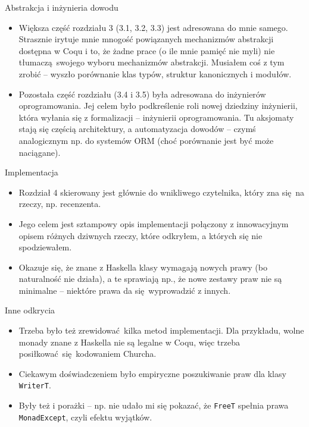 \documentclass{beamer}
\begin{document}
\begin{frame}{Abstrakcja i inżynieria dowodu}
\begin{itemize}
	\item Większa część rozdziału 3 (3.1, 3.2, 3.3) jest adresowana do mnie samego. Strasznie irytuje mnie mnogość powiązanych mechanizmów abstrakcji dostępna w Coqu i to, że żadne prace (o ile mnie pamięć nie myli) nie tłumaczą swojego wyboru mechanizmów abstrakcji. Musiałem coś z tym zrobić -- wyszło porównanie klas typów, struktur kanonicznych i modułów.
	\item Pozostała część rozdziału (3.4 i 3.5) była adresowana do inżynierów oprogramowania. Jej celem było podkreślenie roli nowej dziedziny inżynierii, która wyłania się z formalizacji -- inżynierii oprogramowania. Tu aksjomaty stają się częścią architektury, a automatyzacja dowodów -- czymś analogicznym np. do systemów ORM (choć porównanie jest być może naciągane). 
\end{itemize}
\end{frame}

\begin{frame}{Implementacja}
\begin{itemize}
	\item Rozdział 4 skierowany jest głównie do wnikliwego czytelnika, który zna się na rzeczy, np. recenzenta.
	\item Jego celem jest sztampowy opis implementacji połączony z innowacyjnym opisem różnych dziwnych rzeczy, które odkryłem, a których się nie spodziewałem.
	\item Okazuje się, że znane z Haskella klasy wymagają nowych prawy (bo naturalność nie działa), a te sprawiają np., że nowe zestawy praw nie są minimalne -- niektóre prawa da się wyprowadzić z innych.
\end{itemize}
\end{frame}

\begin{frame}{Inne odkrycia}
\begin{itemize}
	\item Trzeba było też zrewidować kilka metod implementacji. Dla przykładu, wolne monady znane z Haskella nie są legalne w Coqu, więc trzeba posiłkować się kodowaniem Churcha.
	\item Ciekawym doświadczeniem było empiryczne poszukiwanie praw dla klasy \texttt{WriterT}.
	\item Były też i porażki -- np. nie udało mi się pokazać, że \texttt{FreeT} spełnia prawa \texttt{MonadExcept}, czyli efektu wyjątków.
\end{itemize}
\end{frame}
\end{document}
